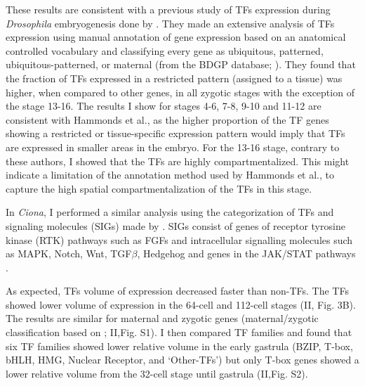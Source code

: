These results are consistent with a previous study of TFs expression during \textit{Drosophila} embryogenesis done by \citet{Hammonds2013}.
They made an extensive analysis of TFs expression using manual annotation of gene expression based on an anatomical controlled vocabulary and classifying every gene as ubiquitous, patterned, ubiquitous-patterned, or maternal (from the BDGP database; \citealp{Tomancak2007}).
They found that the fraction of TFs expressed in a restricted pattern (assigned to a tissue) was higher, when compared to other genes, in all zygotic stages with the exception of the stage 13-16. 
The results I show for stages 4-6, 7-8, 9-10 and 11-12 are consistent with Hammonds et al., as the higher proportion of the TF genes showing a restricted or tissue-specific expression pattern would imply that TFs are expressed in smaller areas in the embryo. For the 13-16 stage, contrary to these authors, I showed that the TFs are highly compartmentalized. This might indicate a limitation of the annotation method used by Hammonds et al., to capture the high spatial compartmentalization of the TFs in this stage.

%

In \textit{Ciona}, I performed a similar analysis using the categorization of TFs and signaling molecules (SIGs) made by \citet{Imai2004}.
SIGs consist of genes of receptor tyrosine kinase (RTK) pathways such as FGFs and intracellular signalling molecules such as MAPK, Notch, Wnt, TGF$\beta$, Hedgehog and genes in the JAK/STAT pathways \citep{Imai2004}. 


As expected, TFs volume of expression decreased faster than non-TFs. The TFs showed lower volume of expression in the 64-cell and 112-cell stages (II, Fig. 3B). 
The results are similar for maternal and zygotic genes (maternal/zygotic classification based on \citealp{Matsuoka2013}; II,Fig. S1). I then compared TF families and found that six TF families showed lower relative volume in the early gastrula (BZIP, T-box, bHLH, HMG, Nuclear Receptor, and `Other-TFs') but only T-box genes showed a lower relative volume from the 32-cell stage until gastrula (II,Fig. S2). 

